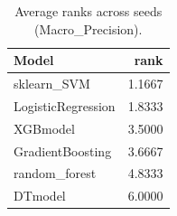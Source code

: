 \begin{table}[t]
\centering
\begin{tabular}{lr}
\toprule
Model & rank \\
\midrule
sklearn_SVM & 1.1667 \\
LogisticRegression & 1.8333 \\
XGBmodel & 3.5000 \\
GradientBoosting & 3.6667 \\
random_forest & 4.8333 \\
DTmodel & 6.0000 \\
\bottomrule
\end{tabular}
\caption{Average ranks across seeds (Macro_Precision).}
\label{tab:avg_rank_Macro_Precision}
\end{table}